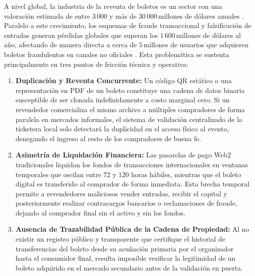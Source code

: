 A nivel global, la industria de la reventa de boletos es un sector con una valoración estimada de entre
$3\,000$ y más de $30\,000$\,millones de dólares anuales \cite{ticketfairy2024}. Paralelo a este crecimiento,
los esquemas de fraude transaccional y falsificación de entradas generan pérdidas globales que superan los
$1\,600$\,millones de dólares al año, afectando de manera directa a cerca de $5$\,millones de usuarios que
adquieren boletos fraudulentos en canales no oficiales \cite{dataintelo2024}. Esta problemática se sustenta
principalmente en tres puntos de fricción técnica y operativa:
\begin{enumerate}
    \item \textbf{Duplicación y Reventa Concurrente:} Un código QR estático o una representación en PDF de un
boleto constituye una cadena de datos binaria susceptible de ser clonada indefinidamente a costo marginal
cero. Si un revendedor comercializa el mismo archivo a múltiples compradores de forma paralela en mercados
informales, el sistema de validación centralizado de la ticketera local solo detectará la duplicidad en el
acceso físico al evento, denegando el ingreso al resto de los compradores de buena fe.
    \item \textbf{Asimetría de Liquidación Financiera:} Las pasarelas de pago Web2 tradicionales liquidan los
fondos de transacciones internacionales en ventanas temporales que oscilan entre $72$ y $120$ horas hábiles,
mientras que el boleto digital es transferido al comprador de forma inmediata. Esta brecha temporal permite a
revendedores maliciosos vender entradas, recibir el capital y posteriormente realizar contracargos bancarios
o reclamaciones de fraude, dejando al comprador final sin el activo y sin los fondos.
    \item \textbf{Ausencia de Trazabilidad Pública de la Cadena de Propiedad:} Al no existir un registro
público y transparente que certifique el historial de transferencias del boleto desde su acuñación primaria
por el organizador hasta el consumidor final, resulta imposible verificar la legitimidad de un boleto
adquirido en el mercado secundario antes de la validación en puerta.
\end{enumerate}

